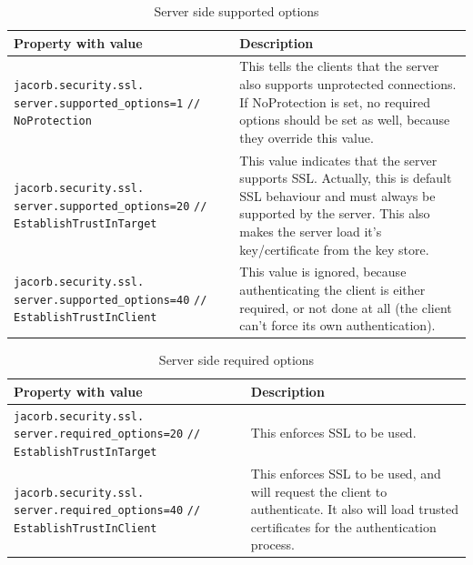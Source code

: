\begin{table}
\caption{Server side supported options}
\begin{tabular}{|p{7cm}|p{7cm}|}
\hline
\textbf{Property with value}& \textbf{Description}\\
\hline
\verb"jacorb.security.ssl."
\verb"server.supported_options=1"
\verb"// NoProtection"& This tells the clients that the server also
supports unprotected connections. If NoProtection is set, no required
options should be set as well, because they override this value. \\
\hline
\verb"jacorb.security.ssl."
\verb"server.supported_options=20"
\verb"// EstablishTrustInTarget"& This value indicates that the server
supports SSL. Actually, this is default SSL behaviour and must always
be supported by the server. This also makes the server load it's
key/certificate from the key store.\\ 
\hline
\verb"jacorb.security.ssl."
\verb"server.supported_options=40"
\verb"// EstablishTrustInClient"&  This value is ignored, because
authenticating the client is either required, or not done at all (the
client can't force its own authentication).\\
\hline
\end{tabular}
\end{table}
\begin{table}

\caption{Server side required options}
\begin{tabular}{|p{7cm}|p{7cm}|}
\hline
\textbf{Property with value}& \textbf{Description}\\
\hline
\verb"jacorb.security.ssl."
\verb"server.required_options=20"
\verb"// EstablishTrustInTarget"& This enforces SSL to be used.\\ 
\hline
\verb"jacorb.security.ssl."
\verb"server.required_options=40"
\verb"// EstablishTrustInClient"&  This enforces SSL to be used, and
will request the client to authenticate. It also will load trusted
certificates for the authentication process.\\ 
\hline
\end{tabular}
\end{table}



